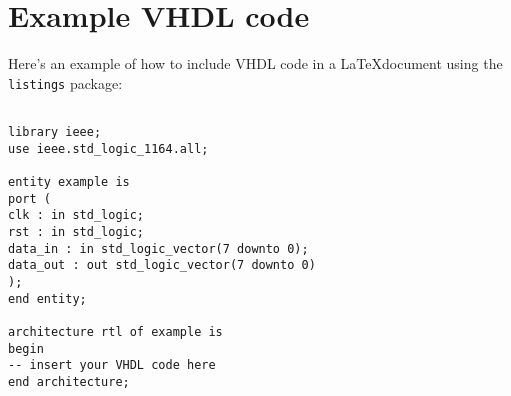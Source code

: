\documentclass{article}
\begin{document}
\section{Example VHDL code}
Here's an example of how to include VHDL code in a \LaTeX document using the \texttt{listings} package:
	
\begin{lstlisting}[style=vhdl,caption={Example VHDL code}]

library ieee;
use ieee.std_logic_1164.all;

entity example is
port (
clk : in std_logic;
rst : in std_logic;
data_in : in std_logic_vector(7 downto 0);
data_out : out std_logic_vector(7 downto 0)
);
end entity;

architecture rtl of example is
begin
-- insert your VHDL code here
end architecture;
\end{lstlisting}
	
\end{document}
